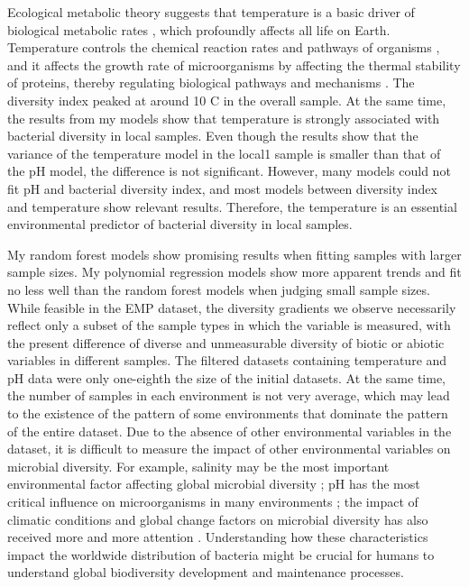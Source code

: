 \documentclass[11pt, a4paper]{article}
\begin{document}
\begin{spacing}{1.5}
Ecological metabolic theory suggests that temperature is a basic driver of biological metabolic rates \citep{brown2004toward}, which profoundly affects all life on Earth. Temperature controls the chemical reaction rates and pathways of organisms \citep{birgander2018responses, dacal2019soil,walker2018microbial}, and it affects the growth rate of microorganisms by affecting the thermal stability of proteins, thereby regulating biological pathways and mechanisms \citep{corkrey2012universality}. The diversity index peaked at around 10 \textdegree C in the overall sample. At the same time, the results from my models show that temperature is strongly associated with bacterial diversity in local samples. Even though the results show that the variance of the temperature model in the local1 sample is smaller than that of the pH model, the difference is not significant. However, many models could not fit pH and bacterial diversity index, and most models between diversity index and temperature show relevant results. Therefore, the temperature is an essential environmental predictor of bacterial diversity in local samples. 

My random forest models show promising results when fitting samples with larger sample sizes. My polynomial regression models show more apparent trends and fit no less well than the random forest models when judging small sample sizes. While feasible in the EMP dataset, the diversity gradients we observe necessarily reflect only a subset of the sample types in which the variable is measured, with the present difference of diverse and unmeasurable diversity of biotic or abiotic variables in different samples. The filtered datasets containing temperature and pH data were only one-eighth the size of the initial datasets. At the same time, the number of samples in each environment is not very average, which may lead to the existence of the pattern of some environments that dominate the pattern of the entire dataset. Due to the absence of other environmental variables in the dataset, it is difficult to measure the impact of other environmental variables on microbial diversity. For example, salinity may be the most important environmental factor affecting global microbial diversity \citep{lozupone2007global}; pH has the most critical influence on microorganisms in many environments \citep{bunse2016response, fierer2006diversity,fierer2011microbes}; the impact of climatic conditions and global change factors on microbial diversity has also received more and more attention \citep{drenovsky2010land, picazo2020climate, scherrer2010infra, zhou2020meta}. Understanding how these characteristics impact the worldwide distribution of bacteria might be crucial for humans to understand global biodiversity development and maintenance processes.


\end{spacing}
\end{document}
